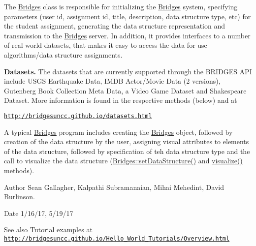 The \mbox{\hyperlink{classbridges_1_1connect_1_1_bridges}{Bridges}} class is responsible for initializing the \mbox{\hyperlink{classbridges_1_1connect_1_1_bridges}{Bridges}} system, specifying parameters (user id, assignment id, title, description, data structure type, etc) for the student assignment, generating the data structure representation and transmission to the \mbox{\hyperlink{classbridges_1_1connect_1_1_bridges}{Bridges}} server. In addition, it provides interfaces to a number of real-\/world datasets, that makes it easy to access the data for use algorithms/data structure assignments. ~\newline


{\bfseries Datasets.} The datasets that are currently supported through the B\+R\+I\+D\+G\+ES A\+PI include U\+S\+GS Earthquake Data, I\+M\+DB Actor/\+Movie Data (2 versions), Gutenberg Book Collection Meta Data, a Video Game Dataset and Shakespeare Dataset. More information is found in the respective methods (below) and at 

\href{http://bridgesuncc.github.io/datasets.html}{\tt http\+://bridgesuncc.\+github.\+io/datasets.\+html} 

A typical \mbox{\hyperlink{classbridges_1_1connect_1_1_bridges}{Bridges}} program includes creating the \mbox{\hyperlink{classbridges_1_1connect_1_1_bridges}{Bridges}} object, followed by creation of the data structure by the user, assigning visual attributes to elements of the data structure, followed by specification of teh data structure type and the call to visualize the data structure (\mbox{\hyperlink{classbridges_1_1connect_1_1_bridges_a921a6603b2445b1abe30a1b3d6f0c255}{Bridges\+::set\+Data\+Structure()}} and \mbox{\hyperlink{classbridges_1_1connect_1_1_bridges_a1853d64ffb8675ba2ec227a2b819cd24}{visualize()}} methods).

\begin{DoxyAuthor}{Author}
Sean Gallagher, Kalpathi Subramanaian, Mihai Mehedint, David Burlinson.
\end{DoxyAuthor}
\begin{DoxyDate}{Date}
1/16/17, 5/19/17
\end{DoxyDate}
\begin{DoxySeeAlso}{See also}
Tutorial examples at ~\newline
 \href{http://bridgesuncc.github.io/Hello_World_Tutorials/Overview.html}{\tt http\+://bridgesuncc.\+github.\+io/\+Hello\+\_\+\+World\+\_\+\+Tutorials/\+Overview.\+html} 
\end{DoxySeeAlso}



